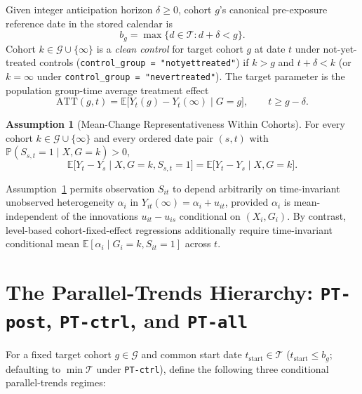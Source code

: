 \documentclass[11pt]{article}
\theoremstyle{definition}
\newtheorem{assumption}{Assumption}
\theoremstyle{remark}
\begin{document}
Given integer anticipation horizon $\delta \ge 0$, cohort $g$'s canonical pre-exposure reference date in the stored calendar is
\[
b_g = \max\{d \in \mathcal{T} : d + \delta < g\}.
\]
Cohort $k \in \mathcal{G} \cup \{\infty\}$ is a \emph{clean control} for target cohort $g$ at date $t$ under not-yet-treated controls (\texttt{control\_group = "notyettreated"}) if $k > g$ and $t + \delta < k$ (or $k = \infty$ under \texttt{control\_group = "nevertreated"}). The target parameter is the population group-time average treatment effect
\[
\mathrm{ATT}(g,t) = \mathbb{E}\bigl[Y_t(g) - Y_t(\infty) \mid G = g\bigr], \qquad t \ge g - \delta.
\]

\begin{assumption}[Mean-Change Representativeness Within Cohorts]\label{ass:mtar}
For every cohort $k \in \mathcal{G} \cup \{\infty\}$ and every ordered date pair $(s,t)$ with $\mathbb{P}(S_{s,t}=1 \mid X, G=k) > 0$,
\[
\mathbb{E}\bigl[Y_t - Y_s \mid X, G = k, S_{s,t} = 1\bigr] = \mathbb{E}\bigl[Y_t - Y_s \mid X, G = k\bigr].
\]
\end{assumption}

Assumption~\ref{ass:mtar} permits observation $S_{it}$ to depend arbitrarily on time-invariant unobserved heterogeneity $\alpha_i$ in $Y_{it}(\infty) = \alpha_i + u_{it}$, provided $\alpha_i$ is mean-independent of the innovations $u_{it} - u_{is}$ conditional on $(X_i, G_i)$. By contrast, level-based cohort-fixed-effect regressions additionally require time-invariant conditional mean $\mathbb{E}[\alpha_i \mid G_i = k, S_{it} = 1]$ across $t$.

\section{The Parallel-Trends Hierarchy: \texttt{PT-post}, \texttt{PT-ctrl}, and \texttt{PT-all}}

For a fixed target cohort $g \in \mathcal{G}$ and common start date $t_{\mathrm{start}} \in \mathcal{T}$ ($t_{\mathrm{start}} \le b_g$; defaulting to $\min \mathcal{T}$ under \texttt{PT-ctrl}), define the following three conditional parallel-trends regimes:
\end{document}
